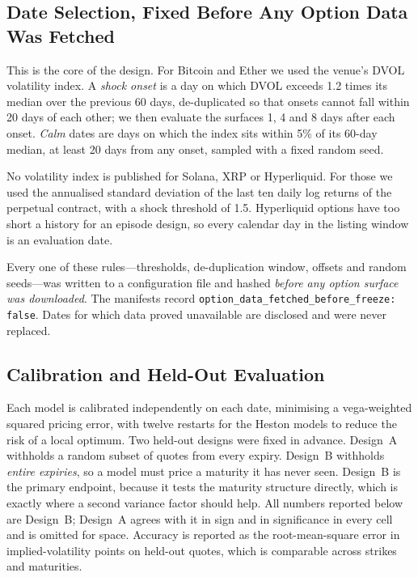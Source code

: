 \documentclass[runningheads]{llncs}
\begin{document}
\subsection{Date Selection, Fixed Before Any Option Data Was Fetched}

This is the core of the design. For Bitcoin and Ether we used the venue's DVOL
volatility index. A \emph{shock onset} is a day on which DVOL exceeds 1.2 times
its median over the previous 60 days, de-duplicated so that onsets cannot fall
within 20 days of each other; we then evaluate the surfaces 1, 4 and 8 days
after each onset. \emph{Calm} dates are days on which the index sits within 5\%
of its 60-day median, at least 20 days from any onset, sampled with a fixed
random seed.

No volatility index is published for Solana, XRP or Hyperliquid. For those we
used the annualised standard deviation of the last ten daily log returns of the
perpetual contract, with a shock threshold of 1.5. Hyperliquid options have too
short a history for an episode design, so every calendar day in the listing
window is an evaluation date.

Every one of these rules---thresholds, de-duplication window, offsets and
random seeds---was written to a configuration file and hashed \emph{before any
option surface was downloaded}. The manifests record
\texttt{option\_data\_fetched\_before\_freeze: false}. Dates for which data
proved unavailable are disclosed and were never replaced.

\subsection{Calibration and Held-Out Evaluation}

Each model is calibrated independently on each date, minimising a
vega-weighted squared pricing error, with twelve restarts for the Heston models
to reduce the risk of a local optimum. Two held-out designs were fixed in
advance. Design~A withholds a random subset of quotes from every expiry.
Design~B withholds \emph{entire expiries}, so a model must price a maturity it
has never seen. Design~B is the primary endpoint, because it tests the maturity
structure directly, which is exactly where a second variance factor should
help. All numbers reported below are Design~B; Design~A agrees with it in sign
and in significance in every cell and is omitted for space. Accuracy is reported as the root-mean-square error in implied-volatility
points on held-out quotes, which is comparable across strikes and maturities.
\end{document}
